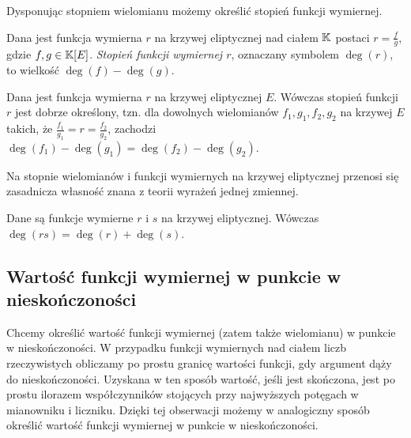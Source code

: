 \noindent
Dysponując stopniem wielomianu możemy określić stopień funkcji wymiernej.

\begin{definition}
Dana jest funkcja wymierna $r$ na krzywej eliptycznej nad ciałem $\mathbb{K}$
postaci $r = \frac{f}{g}$, gdzie $f, g \in \mathbb{K}[E]$.
\emph{Stopień funkcji wymiernej $r$},
oznaczany symbolem $\deg(r)$,
to wielkość $\deg(f) - \deg(g)$.
\end{definition}

\begin{theorem}
Dana jest funkcja wymierna $r$ na krzywej eliptycznej $E$.
Wówczas stopień funkcji $r$ jest dobrze określony,
tzn. dla dowolnych wielomianów $f_1, g_1, f_2, g_2$ na krzywej $E$ takich,
że $\frac{f_1}{g_1} = r = \frac{f_2}{g_2}$,
zachodzi $\deg(f_1) - \deg(g_1) = \deg(f_2) - \deg(g_2)$.
\end{theorem}

\noindent
Na stopnie wielomianów i funkcji wymiernych na krzywej eliptycznej
przenosi się zasadnicza własność znana z teorii wyrażeń jednej zmiennej.

\begin{theorem}
Dane są funkcje wymierne $r$ i $s$ na krzywej eliptycznej.
Wówczas $\deg(rs) = \deg(r) + \deg(s)$.
\end{theorem}

\subsection*{Wartość funkcji wymiernej w punkcie w nieskończoności}

\noindent
Chcemy określić wartość funkcji wymiernej (zatem także wielomianu)
w punkcie w nieskończoności.
W przypadku funkcji wymiernych nad ciałem liczb rzeczywistych
obliczamy po prostu granicę wartości funkcji,
gdy argument dąży do nieskończoności.
Uzyskana w ten sposób wartość, jeśli jest skończona,
jest po prostu ilorazem współczynników stojących przy najwyższych potęgach
w mianowniku i liczniku.
Dzięki tej obserwacji możemy w analogiczny sposób określić
wartość funkcji wymiernej w punkcie w nieskończoności.

